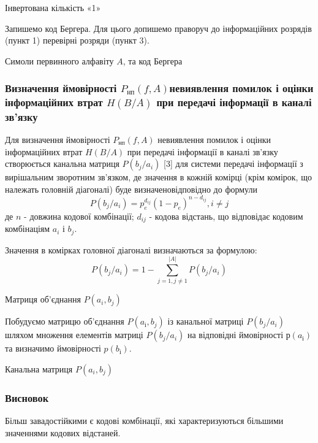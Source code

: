 \documentclass[a4paper,14pt]{extreport}
\begin{document}
\begin{table}[H]
	\caption{Інвертована кількість «1» }
	\centering
	
	\label{table:codewords-control_bits_inverterd}
\end{table}
Запишемо код Бергера.
Для цього допишемо праворуч до інформаційних
розрядів (пункт 1) перевірні розряди (пункт 3).

\begin{table}[H]
	\caption{Симоли первинного алфавіту $A$, та код Бергера}
	\centering
	
	\label{table:berger-code}
\end{table}

\subsubsection{Визначення ймовірності $P_{\text{нп}} (f,A)$невиявлення помилок і оцінки інформаційних втрат $H(B/A)$ при передачі	інформації в каналі зв'язку}

Для визначення ймовірності $P_{\text{нп}} (f,A)$
невиявлення помилок і оцінки інформаційних втрат $H(B/A)$ при передачі інформації в каналі зв'язку створюється канальна матриця $P(b_j/a_i)$ [3] для системи передачі інформації з вирішальним зворотним зв'язком, де значення в кожній комірці (крім комірок, що належать головній діагоналі) буде визначеновідповідно до формули
$$P(b_j/a_i) = p_e^{d_{ij}}(1-p_e)^{n-d_{ij}}, i \neq j$$
де $n$ - довжина кодової комбінації;
$d_{ij}$ - кодова відстань, що відповідає кодовим комбінаціям $a_i$ і $b_j$.

Значення в комірках головної діагоналі визначаються за формулою:
$$P(b_j/a_i) = 1- \sum_{j=1,j \neq 1}^{|A|} P(b_j/a_i) $$


\begin{table}[H]
	\caption{Матриця об'єднання $P(a_i, b_j)$}
	\centering
	\resizebox{\columnwidth}{!}{%
	
}
	\label{table:joint_matrix}
\end{table}

Побудуємо матрицю об’єднання $P(a_{і}, b_{j} )$ із канальної матриці $P(b_j / a_i)$ шляхом множення елементів матриці  $P(b_j / a_i)$  на відповідні ймовірності $р(a_{і} )$ та визначимо ймовірності $p(b_{і} )$.

\begin{table}[H]
	\caption{Канальна матриця $P(a_i, b_j)$}
	\centering
	\resizebox{\columnwidth}{!}{%
		
	}
	\label{table:chennel_matrix}
\end{table}


\subsubsection{Висновок}
Більш завадостійкими є кодові комбінації, які характеризуються більшими
значеннями кодових відстаней.
\end{document}
